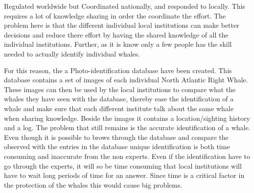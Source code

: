 Regulated worldwide but Coordinated nationally, and responded to locally. This requires a lot of knowledge sharing in order the coordinate the effort. The problem here is that the different individual local institutions can make better decisions and reduce there effort by having the shared knowledge of all the individual institutions.
Further, as it is know only a few people has the skill needed to actually identify individual whales.

For this reason, the a Photo-identification database have been created. 
This database contains a set of images of each individual North Atlantic Right Whale. 
These images can then be used by the local institutions to compare what the whales they have seen with the database, thereby ease the identification of a whale and make sure that each different institute talk about the same whale when sharing knowledge. Beside the images it contains a location/sighting history and a log.
The problem that still remains is the accurate identification of a whale. Even though it is possible to brows through the database and compare the observed with the entries in the database unique identification is both time consuming and inaccurate from the non experts.
Even if the identification have to go through the experts, it will so be time consuming that local institutions will have to wait long periods of time for an answer.
Since time is a critical factor in the protection of the whales this would cause big problems.


